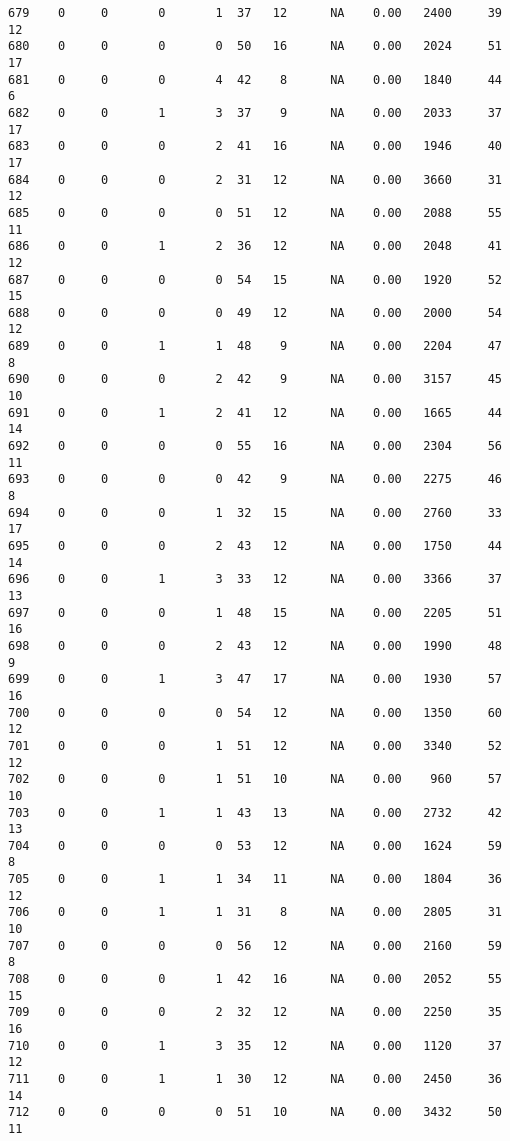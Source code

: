 \documentclass[
  letterpaper,
  DIV=11,
  numbers=noendperiod]{scrreprt}
\begin{document}
\begin{verbatim}
679    0     0       0       1  37   12      NA    0.00   2400     39      12
680    0     0       0       0  50   16      NA    0.00   2024     51      17
681    0     0       0       4  42    8      NA    0.00   1840     44       6
682    0     0       1       3  37    9      NA    0.00   2033     37      17
683    0     0       0       2  41   16      NA    0.00   1946     40      17
684    0     0       0       2  31   12      NA    0.00   3660     31      12
685    0     0       0       0  51   12      NA    0.00   2088     55      11
686    0     0       1       2  36   12      NA    0.00   2048     41      12
687    0     0       0       0  54   15      NA    0.00   1920     52      15
688    0     0       0       0  49   12      NA    0.00   2000     54      12
689    0     0       1       1  48    9      NA    0.00   2204     47       8
690    0     0       0       2  42    9      NA    0.00   3157     45      10
691    0     0       1       2  41   12      NA    0.00   1665     44      14
692    0     0       0       0  55   16      NA    0.00   2304     56      11
693    0     0       0       0  42    9      NA    0.00   2275     46       8
694    0     0       0       1  32   15      NA    0.00   2760     33      17
695    0     0       0       2  43   12      NA    0.00   1750     44      14
696    0     0       1       3  33   12      NA    0.00   3366     37      13
697    0     0       0       1  48   15      NA    0.00   2205     51      16
698    0     0       0       2  43   12      NA    0.00   1990     48       9
699    0     0       1       3  47   17      NA    0.00   1930     57      16
700    0     0       0       0  54   12      NA    0.00   1350     60      12
701    0     0       0       1  51   12      NA    0.00   3340     52      12
702    0     0       0       1  51   10      NA    0.00    960     57      10
703    0     0       1       1  43   13      NA    0.00   2732     42      13
704    0     0       0       0  53   12      NA    0.00   1624     59       8
705    0     0       1       1  34   11      NA    0.00   1804     36      12
706    0     0       1       1  31    8      NA    0.00   2805     31      10
707    0     0       0       0  56   12      NA    0.00   2160     59       8
708    0     0       0       1  42   16      NA    0.00   2052     55      15
709    0     0       0       2  32   12      NA    0.00   2250     35      16
710    0     0       1       3  35   12      NA    0.00   1120     37      12
711    0     0       1       1  30   12      NA    0.00   2450     36      14
712    0     0       0       0  51   10      NA    0.00   3432     50      11

\end{verbatim}
\end{document}
